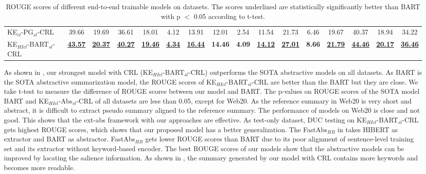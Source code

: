 \begin{table*}[th!]
\begin{center}
\begin{tabular}{|l|c|c|c|c|c|c|c|c|c|c|c|c|c|c|c|}
KE$_{cl}$-PG$_{sl}$-CRL & 39.66 & 19.69 & 36.61 & 18.01 &4.12 &13.91 & 12.01 &2.54 &11.54& 21.73 & 6.46 & 19.67 & 40.37 &18.94 &34.22\\
KE$_{HIcl}$-BART$_{sl}$-CRL & \underline{\bf 43.57} & \underline{\bf 20.37} & \underline{\bf 40.27} & \underline{\bf 19.46} & \underline{\bf 4.34} & \underline{\bf 16.44} & \bf 14.46 & \bf 4.09 & \underline{\bf 14.12} & \underline{\bf 27.01} & \bf 8.66 & \underline{\bf 21.79} & \underline{\bf 44.46} & \underline{\bf 20.17} & \underline{\bf 36.46}\\
\hline
\end{tabular}
\caption{\label{tab:rouge} ROUGE scores of different end-to-end trainable models on datasets. The scores underlined are statistically 
significantly better than BART with p $<$ 0.05 according to t-test.}
\end{center}
\end{table*}

As shown in ,
our strongest model with CRL (KE$_{HIcl}$-BART$_{sl}$-CRL) outperforms
the SOTA abstractive models on all datasets.
As BART is the SOTA abstractive summarization model,
the ROUGE scores of KE$_{HIcl}$-BART$_{sl}$-CRL 
are better than the BART but they are close.  
We take t-test to
measure the difference of ROUGE scores between our model 
and BART.
The p-values on ROUGE scores of the SOTA model BART and KE$_{HIcl}$-Abs$_{sl}$-CRL
of all datasets are less than 0.05, except for Web20.
As the reference summary in Web20 is very short and abstract, it is difficult to extract 
pseudo summary aligned to the reference summary.
The performance of models on Web20 is close and not good. 
\cut{%
}%
This shows
that the ext-abs framework with our approaches are effective.
As test-only dataset, DUC testing on KE$_{HIcl}$-BART$_{sl}$-CRL gets highest ROUGE scores, 
which shows that our proposed model has a better generalization.
The FastAbs$_{HB}$ in  takes HIBERT as extractor and BART as abstractor.
FastAbs$_{HB}$ gets lower ROUGE scores than BART due to its poor alignment of sentence-level training set
and its extractor without keyword-based encoder.
The best ROUGE scores of our models show that
the abstractive models can be improved by locating the salience information.
As shown in , the summary generated by our model with CRL
contains more keywords and becomes more readable.

